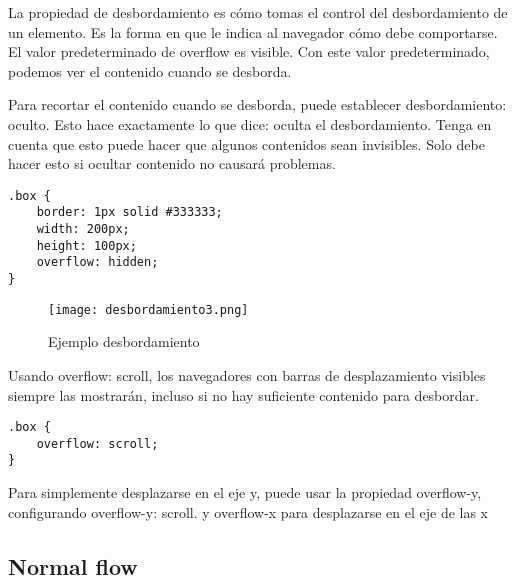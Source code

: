 La propiedad de desbordamiento es cómo tomas el control del desbordamiento de un elemento. Es la forma en que le indica al navegador cómo debe comportarse. El valor predeterminado de overflow es visible. Con este valor predeterminado, podemos ver el contenido cuando se desborda.

Para recortar el contenido cuando se desborda, puede establecer desbordamiento: oculto. Esto hace exactamente lo que dice: oculta el desbordamiento. Tenga en cuenta que esto puede hacer que algunos contenidos sean invisibles. Solo debe hacer esto si ocultar contenido no causará problemas.

\begin{lstlisting}
.box {
	border: 1px solid #333333;
	width: 200px;
	height: 100px;
	overflow: hidden;
}
\end{lstlisting}

\begin{figure}[H]
	\center
	\texttt{[image: desbordamiento3.png]}
	\caption{Ejemplo desbordamiento}
	\label{fig:super}
\end{figure}

Usando overflow: scroll, los navegadores con barras de desplazamiento visibles siempre las mostrarán, incluso si no hay suficiente contenido para desbordar.

\begin{lstlisting}
.box {
	overflow: scroll;
}
\end{lstlisting}

\begin{remark}
Para simplemente desplazarse en el eje y, puede usar la propiedad overflow-y, configurando overflow-y: scroll. y overflow-x para desplazarse en el eje de las x
\end{remark}

\subsection{Normal flow}

